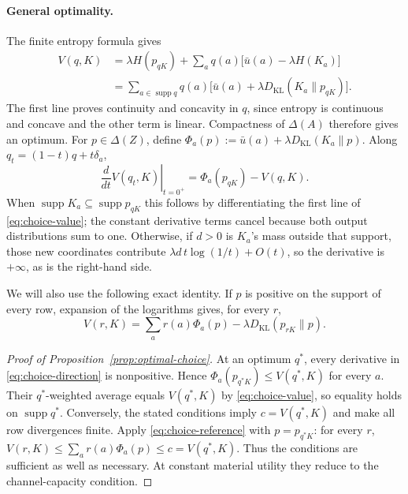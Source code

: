 \documentclass[11pt,a4paper]{article}
\theoremstyle{definition}
\newcommand{\D}{\Delta}
\newcommand{\Sh}{H}
\newcommand{\supp}{\operatorname{supp}}
\newcommand{\KL}{D_{\mathrm{KL}}}
\newcommand{\1}{\mathbf 1}
\begin{document}
\paragraph{General optimality.}
The finite entropy formula gives
\begin{equation}\label{eq:choice-value}
\begin{aligned}
V(q,K)
&=\lambda\Sh(p_{qK})+
  \sum_aq(a)\bigl[\bar u(a)-\lambda\Sh(K_a)\bigr]\\
&=\sum_{a\in\supp q}q(a)
  \bigl[\bar u(a)+\lambda\KL(K_a\|p_{qK})\bigr].
\end{aligned}
\end{equation}
The first line proves continuity and concavity in $q$, since entropy is
continuous and concave and the other term is linear.  Compactness of
$\D(A)$ therefore gives an optimum.  For $p\in\D(Z)$, define
$\Phi_a(p):=\bar u(a)+\lambda\KL(K_a\|p)$.
Along $q_t=(1-t)q+t\delta_a$,
\begin{equation}\label{eq:choice-direction}
\left.\frac{d}{dt}V(q_t,K)\right|_{t=0^+}
=\Phi_a(p_{qK})-V(q,K).
\end{equation}
When $\supp K_a\subseteq\supp p_{qK}$ this follows by differentiating
the first line of \eqref{eq:choice-value}; the constant derivative terms
cancel because both output distributions sum to one.  Otherwise, if $d>0$
is $K_a$'s mass outside that support, those new coordinates contribute
$\lambda d\,t\log(1/t)+O(t)$, so the derivative is $+\infty$, as is the
right-hand side.

We will also use the following exact identity.  If $p$ is positive on the
support of every row, expansion of the logarithms gives, for every $r$,
\begin{equation}\label{eq:choice-reference}
V(r,K)=\sum_a r(a)\Phi_a(p)-\lambda\KL(p_{rK}\|p).
\end{equation}

\begin{proof}[Proof of Proposition~\ref{prop:optimal-choice}]
At an optimum $q^*$, every derivative in \eqref{eq:choice-direction} is
nonpositive.  Hence $\Phi_a(p_{q^*K})\le V(q^*,K)$ for every $a$.
Their $q^*$-weighted average equals $V(q^*,K)$ by
\eqref{eq:choice-value}, so equality holds on $\supp q^*$.
Conversely, the stated conditions imply $c=V(q^*,K)$ and make all row
divergences finite.  Apply \eqref{eq:choice-reference} with $p=p_{q^*K}$:
for every $r$,
$V(r,K)\le\sum_a r(a)\Phi_a(p)\le c=V(q^*,K)$.
Thus the conditions are sufficient as well as necessary.  At constant
material utility they reduce to the channel-capacity condition.
\end{proof}
\end{document}
